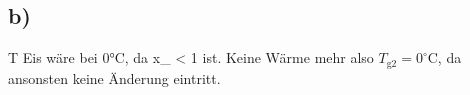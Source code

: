 

\subsection*{b)}

T Eis wäre bei 0°C, da x_{} < 1 ist. Keine Wärme mehr also $T_{\text{g2}} = 0^\circ$C, da ansonsten keine Änderung eintritt.